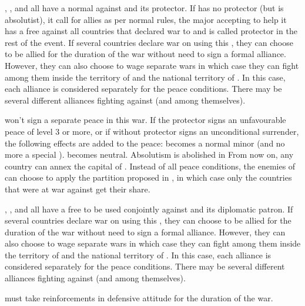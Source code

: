 \phevnt
\aparag \RUS, \AUS, \PRU and \SUE all have a normal \CB against \payspologne
and its protector.
\bparag If \payspologne has no protector (but is absolutist), it call for
allies as per normal rules, the major accepting to help it has a free \CB
against all countries that declared war to \payspologne and is called
protector in the rest of the event.
\aparag If several countries declare war on \payspologne using this \CB, they
can choose to be allied for the duration of the war without need to sign a
formal alliance.
\bparag However, they can also choose to wage separate wars in which case they
can fight among them inside the territory of \payspologne and the national
territory of \POL. In this case, each alliance is considered separately for
the peace conditions.
\bparag There may be several different alliances fighting against \payspologne
(and among themselves).

\phpaix
\aparag \payspologne won't sign a separate peace in this war.
\aparag If the protector signs an unfavourable peace of level 3 or more, or if
\payspologne without protector signs an unconditional surrender, the following
effects are added to the peace:
\bparag \payspologne becomes a normal minor (and no more a special \EG).
\bparag \payspologne becomes neutral.
\bparag Absolutism is abolished in \payspologne
\bparag From now on, any country can annex the capital of \payspologne.
\bparag Instead of all peace conditions, the enemies of \payspologne can
choose to apply the partition proposed in , in
which case only the countries that were at war against \payspologne get their
share.



\phevnt
\aparag \RUS, \AUS, \PRU and \SUE all have a free \CB to be used conjointly
against \payspologne and its diplomatic patron.
\aparag If several countries declare war on \payspologne using this \CB, they
can choose to be allied for the duration of the war without need to sign a
formal alliance.
\bparag However, they can also choose to wage separate wars in which case they
can fight among them inside the territory of \payspologne and the national
territory of \POL. In this case, each alliance is considered separately for
the peace conditions.
\bparag There may be several different alliances fighting against \payspologne
(and among themselves).

\phadm
\aparag \payspologne must take reinforcements in defensive attitude for the
duration of the war.

